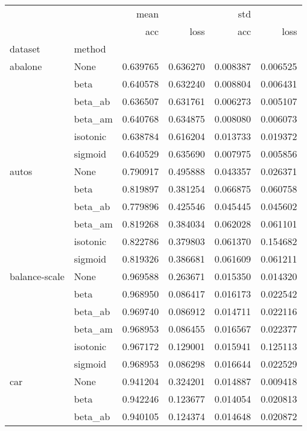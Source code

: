 \begin{tabular}{llrrrr}
\toprule
        &      &      mean &           &       std &           \\
        &      &       acc &      loss &       acc &      loss \\
dataset & method &           &           &           &           \\
\midrule
abalone & None &  0.639765 &  0.636270 &  0.008387 &  0.006525 \\
        & beta &  0.640578 &  0.632240 &  0.008804 &  0.006431 \\
        & beta\_ab &  0.636507 &  0.631761 &  0.006273 &  0.005107 \\
        & beta\_am &  0.640768 &  0.634875 &  0.008080 &  0.006073 \\
        & isotonic &  0.638784 &  0.616204 &  0.013733 &  0.019372 \\
        & sigmoid &  0.640529 &  0.635690 &  0.007975 &  0.005856 \\
autos & None &  0.790917 &  0.495888 &  0.043357 &  0.026371 \\
        & beta &  0.819897 &  0.381254 &  0.066875 &  0.060758 \\
        & beta\_ab &  0.779896 &  0.425546 &  0.045445 &  0.045602 \\
        & beta\_am &  0.819268 &  0.384034 &  0.062028 &  0.061101 \\
        & isotonic &  0.822786 &  0.379803 &  0.061370 &  0.154682 \\
        & sigmoid &  0.819326 &  0.386681 &  0.061609 &  0.061211 \\
balance-scale & None &  0.969588 &  0.263671 &  0.015350 &  0.014320 \\
        & beta &  0.968950 &  0.086417 &  0.016173 &  0.022542 \\
        & beta\_ab &  0.969740 &  0.086912 &  0.014711 &  0.022116 \\
        & beta\_am &  0.968953 &  0.086455 &  0.016567 &  0.022377 \\
        & isotonic &  0.967172 &  0.129001 &  0.015941 &  0.125113 \\
        & sigmoid &  0.968953 &  0.086298 &  0.016644 &  0.022529 \\
car & None &  0.941204 &  0.324201 &  0.014887 &  0.009418 \\
        & beta &  0.942246 &  0.123677 &  0.014054 &  0.020813 \\
        & beta\_ab &  0.940105 &  0.124374 &  0.014648 &  0.020872 \\

\end{tabular}
